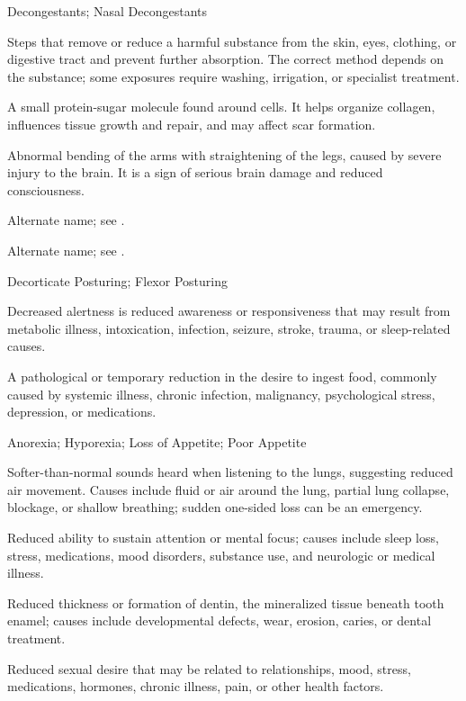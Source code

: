 \synonyms
Decongestants; Nasal Decongestants

 Steps that remove or reduce a harmful substance from the skin, eyes, clothing, or digestive tract and prevent further absorption. The correct method depends on the substance; some exposures require washing, irrigation, or specialist treatment.

 A small protein-sugar molecule found around cells. It helps organize collagen, influences tissue growth and repair, and may affect scar formation.

 Abnormal bending of the arms with straightening of the legs, caused by severe injury to the brain. It is a sign of serious brain damage and reduced consciousness.

 Alternate name; see .

 Alternate name; see .

\synonyms
Decorticate Posturing; Flexor Posturing

 Decreased alertness is reduced awareness or responsiveness that may result from metabolic illness, intoxication, infection, seizure, stroke, trauma, or sleep-related causes.

 A pathological or temporary reduction in the desire to ingest food, commonly caused by systemic illness, chronic infection, malignancy, psychological stress, depression, or medications.

\synonyms
Anorexia; Hyporexia; Loss of Appetite; Poor Appetite

 Softer-than-normal sounds heard when listening to the lungs, suggesting reduced air movement. Causes include fluid or air around the lung, partial lung collapse, blockage, or shallow breathing; sudden one-sided loss can be an emergency.

 Reduced ability to sustain attention or mental focus; causes include sleep loss, stress, medications, mood disorders, substance use, and neurologic or medical illness.

 Reduced thickness or formation of dentin, the mineralized tissue beneath tooth enamel; causes include developmental defects, wear, erosion, caries, or dental treatment.

 Reduced sexual desire that may be related to relationships, mood, stress, medications, hormones, chronic illness, pain, or other health factors.

